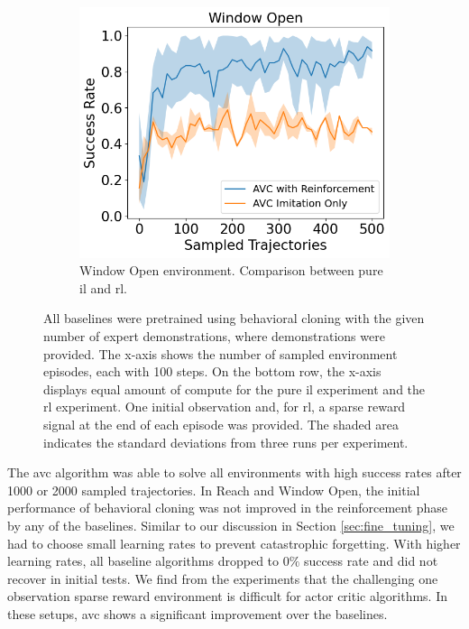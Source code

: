 \begin{figure}[htbp]
\begin{subfigure}[t]{0.45\textwidth}
      \includegraphics[width=\textwidth]{images/1_2000_imi/Window Open.png}
      \caption{Window Open environment. Comparison between pure \ac{il} and \ac{rl}.}
    \end{subfigure}
    \caption{
    All baselines were pretrained using behavioral cloning with the given number of expert demonstrations, where demonstrations were provided. 
    The x-axis shows the number of sampled environment episodes, each with 100 steps. On the bottom row, 
    the x-axis displays equal amount of compute for the pure \ac{il} experiment and the \ac{rl} experiment. 
    One initial observation and, for \ac{rl}, a sparse reward signal at the end of each episode was provided. 
    The shaded area indicates the standard deviations from three runs per experiment.}
    \label{fig:guided_ref}
\end{figure}

The \ac{avc} algorithm was able to solve all environments with high success rates after 1000 or 2000 sampled trajectories. In Reach and Window Open, the initial performance
of behavioral cloning was not improved in the reinforcement phase by any of the baselines. Similar to our discussion in Section \ref{sec:fine_tuning},
we had to choose small learning rates to prevent catastrophic forgetting. With higher learning rates, all baseline algorithms dropped to $0 \%$ success rate and did
not recover in initial tests. We find from the experiments that the challenging one observation sparse reward environment is difficult for
actor critic algorithms. In these setups, \ac{avc} shows a significant improvement over the baselines.

